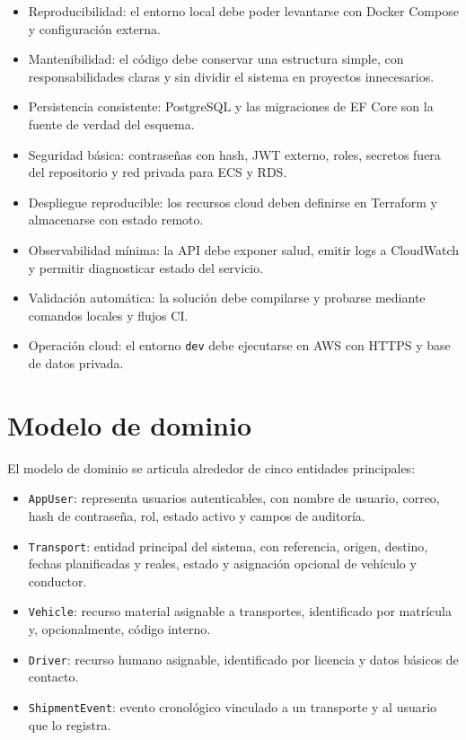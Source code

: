 \begin{itemize}
  \item Reproducibilidad: el entorno local debe poder levantarse con Docker Compose y configuración externa.
  \item Mantenibilidad: el código debe conservar una estructura simple, con responsabilidades claras y sin dividir el sistema en proyectos innecesarios.
  \item Persistencia consistente: PostgreSQL y las migraciones de EF Core son la fuente de verdad del esquema.
  \item Seguridad básica: contraseñas con hash, JWT externo, roles, secretos fuera del repositorio y red privada para ECS y RDS.
  \item Despliegue reproducible: los recursos cloud deben definirse en Terraform y almacenarse con estado remoto.
  \item Observabilidad mínima: la API debe exponer salud, emitir logs a CloudWatch y permitir diagnosticar estado del servicio.
  \item Validación automática: la solución debe compilarse y probarse mediante comandos locales y flujos CI.
  \item Operación cloud: el entorno \texttt{dev} debe ejecutarse en AWS con HTTPS y base de datos privada.
\end{itemize}

\section{Modelo de dominio}
\label{sec:modelo-dominio}

El modelo de dominio se articula alrededor de cinco entidades principales:

\begin{itemize}
  \item \texttt{AppUser}: representa usuarios autenticables, con nombre de usuario, correo, hash de contraseña, rol, estado activo y campos de auditoría.
  \item \texttt{Transport}: entidad principal del sistema, con referencia, origen, destino, fechas planificadas y reales, estado y asignación opcional de vehículo y conductor.
  \item \texttt{Vehicle}: recurso material asignable a transportes, identificado por matrícula y, opcionalmente, código interno.
  \item \texttt{Driver}: recurso humano asignable, identificado por licencia y datos básicos de contacto.
  \item \texttt{ShipmentEvent}: evento cronológico vinculado a un transporte y al usuario que lo registra.
\end{itemize}

